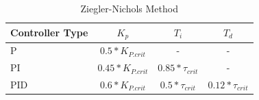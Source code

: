 \begin{table}[H]
\begin{center}
\begin{tabular}{ l | c | c | c}
  Controller Type & $K_p$ & $T_i$ & $T_d$\\
  \hline
  \hline
  P & $0.5 * K_{P.crit}$& - & -\\
  \hline
  PI & $0.45 * K_{P.crit}$ & $0.85 * \tau_{crit}$ & - \\
  \hline
  PID & $0.6 * K_{P.crit}$ & $0.5 * \tau_{crit}$ & $0.12 * \tau_{crit}$\\
  \hline
\end{tabular}
\end{center}
\caption{Ziegler-Nichols Method}
\label{tab:ziegler}
\end{table}
